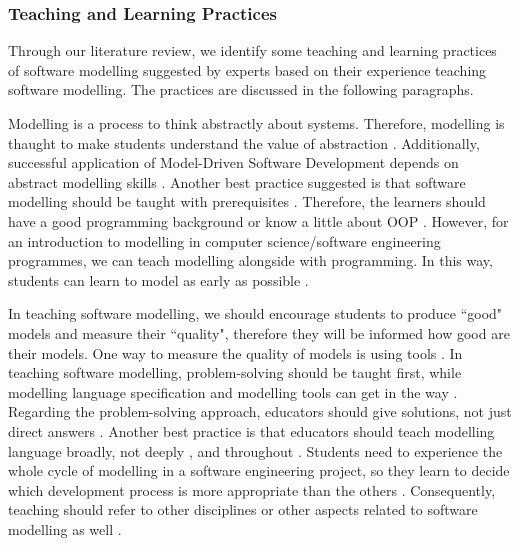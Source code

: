 \documentclass[12pt, a4paper]{report}
\begin{document}
{\subsubsection{Teaching and Learning Practices}
Through our literature review, we identify some teaching and learning practices of software modelling suggested by experts based on their experience teaching software modelling. The practices are discussed in the following paragraphs.

Modelling is a process to think abstractly about systems. Therefore, modelling is thaught to make students understand the value of abstraction \cite{bezivin2009teaching}. Additionally, successful application of Model-Driven Software Development depends on abstract modelling skills \cite{whittle2013industrial}. Another best practice suggested is that software modelling should be taught with prerequisites \cite{paige2014bad}. Therefore, the learners should have a good programming background \cite{bezivin2009teaching} or know a little about OOP \cite{Akayama2013}. However, for an introduction to modelling in computer science/software engineering programmes, we can teach modelling alongside with programming\cite{borstler2012teaching, bezivin2009teaching}. In this way, students can learn to model as early as possible \cite{Akayama2013, borstler2012teaching}. 

In teaching software modelling, we should encourage students to produce ``good" models and measure their ``quality", therefore they will be informed how good are their models. One way to measure the quality of models is using tools \cite{Akayama2013}. In teaching software modelling, problem-solving should be taught first, while modelling language specification and modelling tools can get in the way \cite{paige2014bad}. Regarding the problem-solving approach, educators should give solutions, not just direct answers \cite{paige2014bad}. Another best practice is that educators should teach modelling language broadly, not deeply \cite{paige2014bad}, and throughout \cite{borstler2012teaching}. Students need to experience the whole cycle of modelling in a software engineering project, so they learn to decide which development process is more appropriate than the others \cite{Akayama2013}. Consequently, teaching should refer to other disciplines or other aspects related to software modelling as well \cite{paige2014bad}.

}
\end{document}
